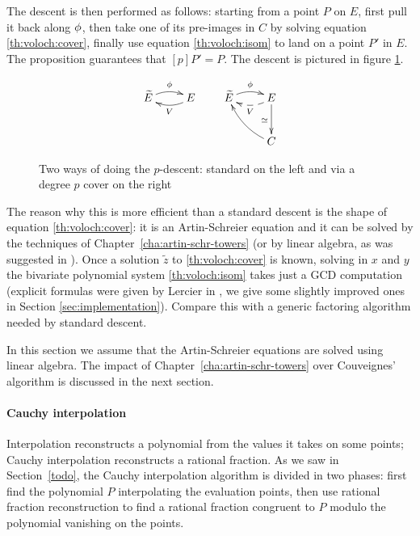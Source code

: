 The descent is then performed as follows: starting from a point $P$ on
$E$, first pull it back along $\phi$, then take one of its
pre-images in $C$ by solving equation \eqref{th:voloch:cover}, finally
use equation \eqref{th:voloch:isom} to land on a point $P'$ in $E$.
The proposition guarantees that $[p]P' = P$. The descent is pictured
in figure \ref{fig:voloch}.

\begin{figure}
  \centering
  \[
  \xymatrix{\widetilde{E}\ar@/^/[r]^{\frobisog} & E\ar@/^/[l]^{V}}
  \qquad
  \xymatrix{
    \widetilde{E}\ar@/^/[r]^{\frobisog} & E\ar@/^/@{-->}[l]^{V}\ar[d]_{\simeq}\\
    & C\ar@/^/[ul]
  }
  \]
  
  \caption{Two ways of doing the $p$-descent: standard on the left and via a degree $p$ cover on the right}
  \label{fig:voloch}
\end{figure}


The reason why this is more efficient than a standard descent is the
shape of equation \eqref{th:voloch:cover}: it is an Artin-Schreier
equation and it can be solved by the techniques of
Chapter~\ref{cha:artin-schr-towers} (or by linear algebra, as was
suggested in \cite{couveignes96}). Once a solution $\tilde{z}$ to
\eqref{th:voloch:cover} is known, solving in $x$ and $y$ the bivariate
polynomial system \eqref{th:voloch:isom} takes just a GCD computation
(explicit formulas were given by Lercier in
\cite[$\S$6.2]{lercier-algorithmique}, we give some slightly improved
ones in Section \ref{sec:implementation}). Compare this with a generic
factoring algorithm needed by standard descent.

In this section we assume that the Artin-Schreier equations are solved
using linear algebra. The impact of
Chapter~\ref{cha:artin-schr-towers} over Couveignes' algorithm is
discussed in the next section.


\paragraph{Cauchy interpolation}
Interpolation reconstructs a polynomial from the values it takes on
some points; Cauchy interpolation reconstructs a rational fraction. As
we saw in Section~\ref{todo}, the Cauchy interpolation algorithm is
divided in two phases: first find the polynomial $P$ interpolating the
evaluation points, then use rational fraction reconstruction to find a
rational fraction congruent to $P$ modulo the polynomial vanishing on
the points.

